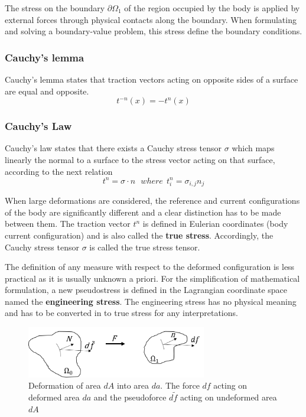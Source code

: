 The stress on the boundary $\partial \Omega_1$ of the region occupied by the body is applied by external forces through physical contacts along the boundary. When formulating and solving a boundary-value problem, this stress define the boundary conditions.


\subsubsection*{Cauchy's lemma}

Cauchy's lemma states that traction vectors acting on opposite sides of a surface are equal and opposite.
\begin{equation}
t^{-n}(x) = -t^n(x)
\label{chauchyLemma}
\end{equation}
\subsubsection*{Cauchy's Law}
Cauchy’s law states that there exists a Cauchy stress tensor $\sigma$ which maps linearly the normal to a surface to the stress vector acting on that surface, according to the next relation
\begin{equation}
t^n = \sigma \cdot n \ \ \ where \  \ t^n_i = \sigma_{i,j} n_j
\end{equation}

When large deformations are considered, the reference and current configurations of the body are significantly different and a clear distinction has to be made between them. The traction vector $t^n$ is defined in Eulerian coordinates (body current configuration) and is also called the \textbf{true stress}. Accordingly, the Cauchy stress tensor $\sigma$ is called the true stress tensor.

The definition of any measure with respect to the deformed configuration is less practical as it is usually unknown a priori. For the simplification of mathematical formulation, a new pseudostress is defined in the Lagrangian coordinate space named the \textbf{engineering stress}. The engineering stress has no physical meaning and has to be converted in to true stress for any interpretations.


\begin{figure}
\begin{center}
\includegraphics[width=0.7\textwidth,keepaspectratio]{figures/stressnotion.png} 
\caption[]{Deformation of area $dA$  into area $da$. The force $df$ acting on deformed area $da$ and the pseudoforce $d\tilde{f}$ acting on undeformed area $dA$}
\label{stressnotion}
\end{center}
\end{figure} 


